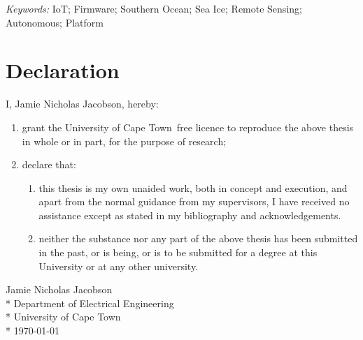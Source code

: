 \documentclass[a4paper, 12pt, oneside, openright, parskip=full]{book}
\newcommand{\auth}{Jamie Nicholas Jacobson}								%
\newcommand{\dept}{Department of Electrical Engineering}%
\newcommand{\uni}{University of Cape Town}				%
\newcommand{\key}{IoT; Firmware; Southern Ocean; Sea Ice; Remote Sensing; Autonomous; Platform}					   %
\newcommand*{\signature}[1]
{
	\par\noindent\makebox [5cm]{\hrulefill}
	\par\noindent\makebox [5cm][1]{#1}
}
\begin{document}
\begin{titlepage}
		\vskip 7mm	
	\begin{normalsize}			
		{\itshape Keywords:}
		\key			
	\end{normalsize}	
\end{titlepage}

\frontmatter
\chapter{Declaration}				
\label{ch:decl}
I, \auth,  hereby:

\begin{enumerate}
	\item		grant the \uni\  free licence to reproduce the above thesis in whole or in part, for the purpose of research;
	\item		declare that:
	
	\begin{enumerate}
		\item		this thesis is my own unaided work, both in concept and execution, and apart from the normal guidance from my supervisors, I have received no assistance except as stated in my bibliography and acknowledgements.

		\item		neither the substance nor any part of the above thesis has been submitted in the past, or is being, or is to be submitted for a degree at this University or at any other university.
	\end{enumerate}	
\end{enumerate}

\begin{flushright}	%
	\vskip 6cm
	\noindent \signature{x}
	\noindent \auth \\*
	\vskip 2mm
	\noindent \dept \\*
	\noindent \uni \\*
	\vskip 2mm
	\noindent \today
\end{flushright}

\end{document}
